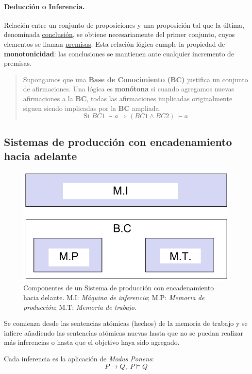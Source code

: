 \documentclass[10pt,a4paper]{article}
\begin{document}
\paragraph{Deducción o Inferencia.}
Relación entre un conjunto de proposiciones y una proposición tal que la última, denominada \underline{conclusión}, se obtiene necesariamente del primer conjunto, cuyos elementos se llaman \underline{premisas}.  Esta relación lógica cumple la propiedad de \textbf{monotonicidad}: las conclusiones se mantienen ante cualquier incremento de premisas.

\begin{quote}
Supongamos que una \textbf{Base de Conocimiento (BC)} justifica un conjunto de afirmaciones. Una lógica es \textbf{monótona} si cuando agregamos nuevas afirmaciones a la \textbf{BC}, todas las afirmaciones implicadas originalmente siguen siendo implicadas por la \textbf{BC} ampliada.
\[\text{Si }BC1 \: \models a \Rightarrow (BC1 \wedge BC2)\: \models a\]
\end{quote}

\subsection{Sistemas de producción con encadenamiento hacia adelante}
\begin{figure}
  \label{fig:encadenamiento}
  \caption{Componentes de un Sistema de producción con encadenamiento hacia delante. M.I: \textit{Máquina de inferencia}; M.P: \textit{Memoria de producción}; M.T: \textit{Memoria de trabajo}.}
  \centering
  \hbox{\includegraphics[width=0.4\textwidth-\fboxrule-\fboxrule]{encadenamiento.png}}  
\end{figure}
Se comienza desde las sentencias atómicas (hechos) de la memoria de trabajo y se infiere añadiendo las sentencias atómicas nuevas hasta que no se puedan realizar más inferencias o hasta que el objetivo haya sido agregado.

Cada inferencia es la aplicación de \textit{Modus Ponens}:
\[P \rightarrow Q, \; P \models Q\]
\end{document}
